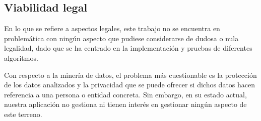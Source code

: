 \subsection{Viabilidad legal}

En lo que se refiere a aspectos legales, este trabajo no se encuentra en problemática con ningún aspecto que pudiese considerarse de dudosa o nula legalidad, dado que se ha centrado en la implementación y pruebas de diferentes algoritmos.

Con respecto a la minería de datos, el problema más cuestionable es la protección de los datos analizados y la privacidad que se puede ofrecer  si dichos datos hacen referencia a una persona o entidad concreta. Sin embargo, en su estado actual, nuestra aplicación no gestiona ni tienen interés en gestionar ningún aspecto de este terreno. 



